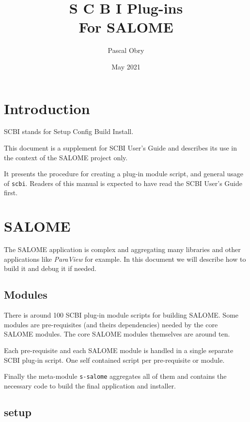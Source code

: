 \documentclass[a4paper,12pt,twoside]{article}
\title{\huge{S C B I \hspace{2mm} Plug-ins} \\ For SALOME}
\author{Pascal Obry}
\date{May 2021}
\newcommand{\code}[1]{\texttt{#1}}
\renewcommand{\emph}[1]{\textit{#1}}
\let\stdsection\section
\renewcommand\section{\newpage\stdsection}
\begin{document}
\maketitle

\tableofcontents


\section{Introduction}

SCBI stands for Setup Config Build Install.

This document is a supplement for SCBI User's Guide and describes its use in the context of the SALOME project only.

It presents the procedure for creating a plug-in module script, and general usage of \code{scbi}. Readers of this manual is expected to have read the SCBI User's Guide first.


\section{SALOME}

The SALOME application is complex and aggregating many libraries and other applications like \emph{ParaView} for example. In this document we will describe how to build it and debug it if needed.

\subsection{Modules}
\label{modules}

There is around 100 SCBI plug-in module scripts for building SALOME. Some modules are pre-requisites (and theirs dependencies) needed by the core SALOME modules. The core SALOME modules themselves are around ten.

Each pre-requisite and each SALOME module is handled in a single separate SCBI plug-in script. One self contained script per pre-requisite or module.

Finally the meta-module \code{s-salome} aggregates all of them and contains the necessary code to build the final application and installer.

\subsection{setup}
\end{document}
